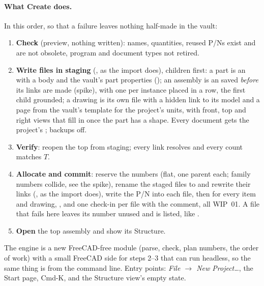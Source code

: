 \paragraph{What Create does.} In this order, so that a failure leaves nothing half-made in the vault:
\begin{enumerate}[nosep]
  \item \textbf{Check} (preview, nothing written): names, quantities, reused P/Ns exist and are not obsolete, program
        and document types not retired.
  \item \textbf{Write files in staging} (, as the import does), children first: a part is an
         with a body and the vault's part properties (); an assembly is an
         saved \emph{before} its links are made (spike), with one  per
        instance placed in a row, the first child grounded; a drawing is its own file with a hidden link to its model and
        a page from the vault's template for the project's units, with front, top and right views that fill in once the
        part has a shape. Every document gets the project's ; backups off.
  \item \textbf{Verify}: reopen the top from staging; every link resolves and every count matches $T$.
  \item \textbf{Allocate and commit}: reserve the numbers (flat, one parent each; family numbers collide, see the spike),
        rename the staged files to  and rewrite their links (, as the import
        does), write the P/N into each file, then  for every item and drawing,
        , and one check-in per file with the comment, all WIP~01. A file that fails here leaves its
        number unused and is listed, like .
  \item \textbf{Open} the top assembly and show its Structure.
\end{enumerate}
The engine is a new FreeCAD-free module  (parse, check, plan numbers, the order of work)
with a small FreeCAD side for steps 2--3 that can run headless, so the same thing is  from the command line. Entry points: \emph{File $\rightarrow$ New Project\ldots}, the Start page,
Cmd-K, and the Structure view's empty state.

